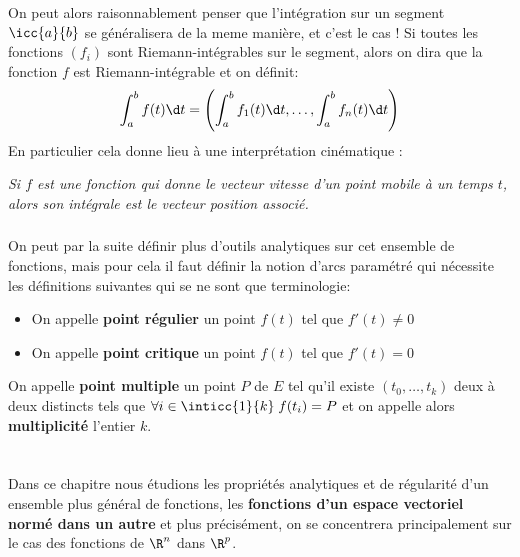 \subsection*{}
On peut alors raisonnablement penser que l'intégration sur un segment \(\icc{a}{b}\) se généralisera de la meme manière, et c'est le cas ! Si toutes les fonctions \((f_i)\) sont Riemann-intégrables sur le segment, alors on dira que la fonction \(f\) est Riemann-intégrable et on définit:
\[
   \int_{a}^{b} f(t) \d t = \left(\int_{a}^{b} f_1(t) \d t, \ldots, \int_{a}^{b} f_n(t) \d t\right)   
\]
En particulier cela donne lieu à une interprétation cinématique :
\begin{center}
   \textit{Si \(f\) est une fonction qui donne le vecteur vitesse d'un point mobile à un temps \(t\), alors son intégrale est le vecteur position associé.}
\end{center}
\subsection*{}
On peut par la suite définir plus d'outils analytiques sur cet ensemble de fonctions, mais pour cela il faut définir la notion d'arcs paramétré qui nécessite les définitions suivantes qui se ne sont que terminologie:
\begin{itemize}
   \item On appelle \textbf{point régulier} un point \(f(t)\) tel que \(f'(t) \neq 0\)
   \item On appelle \textbf{point critique} un point \(f(t)\) tel que \(f'(t) = 0\)
\end{itemize}
On appelle \textbf{point multiple} un point \(P\) de \(E\) tel qu'il existe \((t_0, \ldots, t_k)\) deux à deux distincts tels que \(\forall i \in \inticc{1}{k} \; f(t_i) = P\) et on appelle alors \textbf{multiplicité} l'entier \(k\).

\chapter*{}

Dans ce chapitre nous étudions les propriétés analytiques et de régularité d'un ensemble plus général de fonctions, les \textbf{fonctions d'un espace vectoriel normé dans un autre} et plus précisément, on se concentrera principalement sur le cas des fonctions de \(\R^n\) dans \(\R^p\).\<

